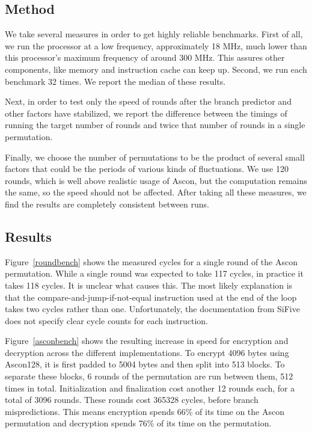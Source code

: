 \subsection{Method}

We take several measures in order to get highly reliable benchmarks. First of
all, we run the processor at a low frequency, approximately 18 MHz, much lower
than this processor's maximum frequency of around 300 MHz. This assures other
components, like memory and instruction cache can keep up. Second, we run each
benchmark 32 times. We report the median of these results.

Next, in order to test only the speed of rounds after the branch predictor and
other factors have stabilized, we report the difference between the timings of
running the target number of rounds and twice that number of rounds in a single
permutation.

Finally, we choose the number of permutations to be the product of several small
factors that could be the periods of various kinds of fluctuations. We use 120
rounds, which is well above realistic usage of Ascon, but the computation
remains the same, so the speed should not be affected. After taking all these
measures, we find the results are completely consistent between runs.

\subsection{Results}

Figure~\ref{roundbench} shows the measured cycles for a single round of the Ascon
permutation. While a single round was expected to take 117 cycles, in practice
it takes 118 cycles. It is unclear what causes this. The most likely explanation
is that the compare-and-jump-if-not-equal instruction used at the end of the
loop takes two cycles rather than one. Unfortunately, the documentation from
SiFive does not specify clear cycle counts for each instruction.

Figure~\ref{asconbench} shows the resulting increase in speed for encryption and
decryption across the different implementations. To encrypt 4096 bytes using
Ascon128, it is first padded to 5004 bytes and then split into 513 blocks. To
separate these blocks, 6 rounds of the permutation are run between them, 512
times in total. Initialization and finalization cost another 12 rounds each, for
a total of 3096 rounds. These rounds cost 365328 cycles, before branch
mispredictions. This means encryption spends 66\% of its time on the Ascon
permutation and decryption spends 76\% of its time on the permutation.

